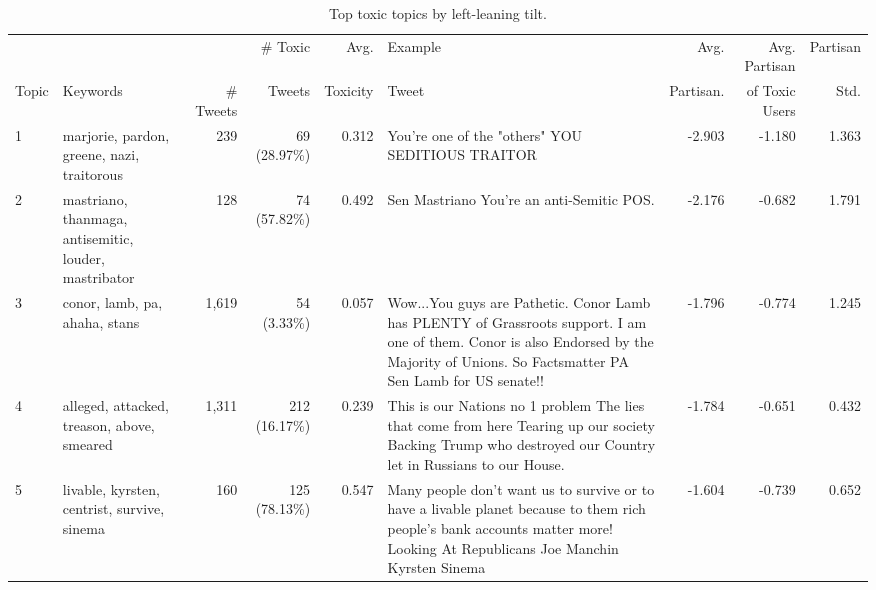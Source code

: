 \begin{table}
\centering
\scriptsize
\selectfont
\setlength{\tabcolsep}{4pt}
\begin{tabularx}{\textwidth}{l|XrrrXrrr}
\toprule
 &   &  &   \# Toxic  & Avg.& Example & Avg.  & Avg. Partisan  & Partisan \\
 Topic& {Keywords}&\# Tweets & Tweets & Toxicity &  Tweet  & Partisan. & of Toxic Users& Std. \\

\midrule
 1 & marjorie, pardon, greene, nazi, traitorous &239 & 69 (28.97\%) &0.312 & You're one of the "others" YOU SEDITIOUS TRAITOR 
 & -2.903 &-1.180& 1.363\\

  2 & mastriano, thanmaga, antisemitic, louder, mastribator & 128& 74 (57.82\%) &0.492 & Sen Mastriano You're an anti-Semitic POS.
 & -2.176& -0.682 & 1.791 \\
  3 & conor, lamb, pa, ahaha, stans &1,619& 54 (3.33\%)&0.057 & Wow...You guys are Pathetic. Conor Lamb has PLENTY of Grassroots support. I am one of them. Conor is also Endorsed by the Majority of Unions. So Factsmatter PA Sen Lamb for US senate!! 
 & -1.796 &-0.774 & 1.245\\

 4 &alleged, attacked, treason, above, smeared &1,311& 212 (16.17\%) &0.239 & 
This is our Nations no 1 problem
The lies that come from here
Tearing up our society
Backing Trump who destroyed our Country let in Russians to our House. & -1.784& -0.651 & 0.432\\

 5 & livable, kyrsten, centrist, survive, sinema & 160& 125 (78.13\%)&0.547 & Many people don't want us to survive or to have a livable planet because to them rich people's bank accounts matter more! Looking At Republicans Joe Manchin Kyrsten Sinema& -1.604& -0.739 &0.652\\
\bottomrule 
\end{tabularx}
\caption{\label{tab:liberal-topics} Top toxic topics by left-leaning tilt.} 
\vspace{-10pt}
\end{table}








